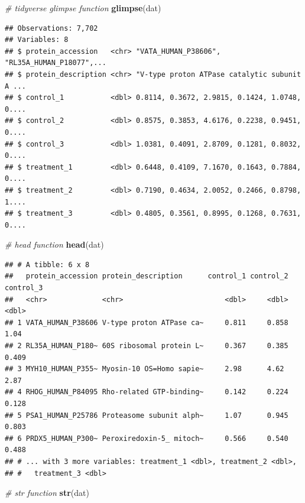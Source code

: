 \documentclass[12pt,]{book}
\newenvironment{Shaded}{\begin{snugshade}}{\end{snugshade}}
\newcommand{\KeywordTok}[1]{\textcolor[rgb]{0.13,0.29,0.53}{\textbf{#1}}}
\newcommand{\CommentTok}[1]{\textcolor[rgb]{0.56,0.35,0.01}{\textit{#1}}}
\newcommand{\NormalTok}[1]{#1}
\theoremstyle{definition}
\theoremstyle{definition}
\theoremstyle{definition}
\theoremstyle{remark}
\begin{document}
\begin{Shaded}
\begin{Highlighting}[]
\CommentTok{# tidyverse glimpse function}
\KeywordTok{glimpse}\NormalTok{(dat)}
\end{Highlighting}
\end{Shaded}

\begin{verbatim}
## Observations: 7,702
## Variables: 8
## $ protein_accession   <chr> "VATA_HUMAN_P38606", "RL35A_HUMAN_P18077",...
## $ protein_description <chr> "V-type proton ATPase catalytic subunit A ...
## $ control_1           <dbl> 0.8114, 0.3672, 2.9815, 0.1424, 1.0748, 0....
## $ control_2           <dbl> 0.8575, 0.3853, 4.6176, 0.2238, 0.9451, 0....
## $ control_3           <dbl> 1.0381, 0.4091, 2.8709, 0.1281, 0.8032, 0....
## $ treatment_1         <dbl> 0.6448, 0.4109, 7.1670, 0.1643, 0.7884, 0....
## $ treatment_2         <dbl> 0.7190, 0.4634, 2.0052, 0.2466, 0.8798, 1....
## $ treatment_3         <dbl> 0.4805, 0.3561, 0.8995, 0.1268, 0.7631, 0....
\end{verbatim}

\begin{Shaded}
\begin{Highlighting}[]
\CommentTok{# head function}
\KeywordTok{head}\NormalTok{(dat)}
\end{Highlighting}
\end{Shaded}

\begin{verbatim}
## # A tibble: 6 x 8
##   protein_accession protein_description      control_1 control_2 control_3
##   <chr>             <chr>                        <dbl>     <dbl>     <dbl>
## 1 VATA_HUMAN_P38606 V-type proton ATPase ca~     0.811     0.858     1.04 
## 2 RL35A_HUMAN_P180~ 60S ribosomal protein L~     0.367     0.385     0.409
## 3 MYH10_HUMAN_P355~ Myosin-10 OS=Homo sapie~     2.98      4.62      2.87 
## 4 RHOG_HUMAN_P84095 Rho-related GTP-binding~     0.142     0.224     0.128
## 5 PSA1_HUMAN_P25786 Proteasome subunit alph~     1.07      0.945     0.803
## 6 PRDX5_HUMAN_P300~ Peroxiredoxin-5_ mitoch~     0.566     0.540     0.488
## # ... with 3 more variables: treatment_1 <dbl>, treatment_2 <dbl>,
## #   treatment_3 <dbl>
\end{verbatim}

\begin{Shaded}
\begin{Highlighting}[]
\CommentTok{# str function}
\KeywordTok{str}\NormalTok{(dat)}
\end{Highlighting}
\end{Shaded}
\end{document}
